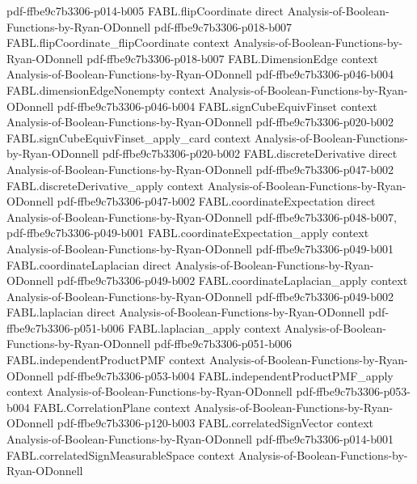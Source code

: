 \begin{theorem}
  {pdf-ffbe9c7b3306-p014-b005}
\proofstep
  {FABL.flipCoordinate}
  {direct}
  {Analysis-of-Boolean-Functions-by-Ryan-ODonnell}
  {pdf-ffbe9c7b3306-p018-b007}
\proofstep
  {FABL.flipCoordinate_flipCoordinate}
  {context}
  {Analysis-of-Boolean-Functions-by-Ryan-ODonnell}
  {pdf-ffbe9c7b3306-p018-b007}
\proofstep
  {FABL.DimensionEdge}
  {context}
  {Analysis-of-Boolean-Functions-by-Ryan-ODonnell}
  {pdf-ffbe9c7b3306-p046-b004}
\proofstep
  {FABL.dimensionEdgeNonempty}
  {context}
  {Analysis-of-Boolean-Functions-by-Ryan-ODonnell}
  {pdf-ffbe9c7b3306-p046-b004}
\proofstep
  {FABL.signCubeEquivFinset}
  {context}
  {Analysis-of-Boolean-Functions-by-Ryan-ODonnell}
  {pdf-ffbe9c7b3306-p020-b002}
\proofstep
  {FABL.signCubeEquivFinset_apply_card}
  {context}
  {Analysis-of-Boolean-Functions-by-Ryan-ODonnell}
  {pdf-ffbe9c7b3306-p020-b002}
\proofstep
  {FABL.discreteDerivative}
  {direct}
  {Analysis-of-Boolean-Functions-by-Ryan-ODonnell}
  {pdf-ffbe9c7b3306-p047-b002}
\proofstep
  {FABL.discreteDerivative_apply}
  {context}
  {Analysis-of-Boolean-Functions-by-Ryan-ODonnell}
  {pdf-ffbe9c7b3306-p047-b002}
\proofstep
  {FABL.coordinateExpectation}
  {direct}
  {Analysis-of-Boolean-Functions-by-Ryan-ODonnell}
  {pdf-ffbe9c7b3306-p048-b007,
    pdf-ffbe9c7b3306-p049-b001}
\proofstep
  {FABL.coordinateExpectation_apply}
  {context}
  {Analysis-of-Boolean-Functions-by-Ryan-ODonnell}
  {pdf-ffbe9c7b3306-p049-b001}
\proofstep
  {FABL.coordinateLaplacian}
  {direct}
  {Analysis-of-Boolean-Functions-by-Ryan-ODonnell}
  {pdf-ffbe9c7b3306-p049-b002}
\proofstep
  {FABL.coordinateLaplacian_apply}
  {context}
  {Analysis-of-Boolean-Functions-by-Ryan-ODonnell}
  {pdf-ffbe9c7b3306-p049-b002}
\proofstep
  {FABL.laplacian}
  {direct}
  {Analysis-of-Boolean-Functions-by-Ryan-ODonnell}
  {pdf-ffbe9c7b3306-p051-b006}
\proofstep
  {FABL.laplacian_apply}
  {context}
  {Analysis-of-Boolean-Functions-by-Ryan-ODonnell}
  {pdf-ffbe9c7b3306-p051-b006}
\proofstep
  {FABL.independentProductPMF}
  {context}
  {Analysis-of-Boolean-Functions-by-Ryan-ODonnell}
  {pdf-ffbe9c7b3306-p053-b004}
\proofstep
  {FABL.independentProductPMF_apply}
  {context}
  {Analysis-of-Boolean-Functions-by-Ryan-ODonnell}
  {pdf-ffbe9c7b3306-p053-b004}
\proofstep
  {FABL.CorrelationPlane}
  {context}
  {Analysis-of-Boolean-Functions-by-Ryan-ODonnell}
  {pdf-ffbe9c7b3306-p120-b003}
\proofstep
  {FABL.correlatedSignVector}
  {context}
  {Analysis-of-Boolean-Functions-by-Ryan-ODonnell}
  {pdf-ffbe9c7b3306-p014-b001}
\proofstep
  {FABL.correlatedSignMeasurableSpace}
  {context}
  {Analysis-of-Boolean-Functions-by-Ryan-ODonnell}

\end{theorem}
